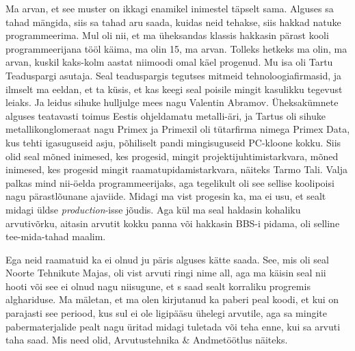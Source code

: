 Ma arvan, et see muster on ikkagi enamikel inimestel täpselt sama. Alguses sa tahad mängida, siis sa tahad aru saada, kuidas neid tehakse, siis hakkad natuke programmeerima. Mul oli nii, et ma üheksandas klassis hakkasin pärast kooli programmeerijana tööl käima,  ma olin 15, ma arvan. Tolleks hetkeks ma olin, ma arvan, kuskil kaks-kolm aastat niimoodi omal käel progenud. Mu isa oli Tartu Teaduspargi asutaja. Seal teaduspargis tegutses  mitmeid tehnoloogiafirmasid, ja ilmselt ma eeldan, et ta küsis, et kas keegi seal poisile mingit kasulikku tegevust leiaks. Ja leidus sihuke hulljulge mees nagu Valentin Abramov. Üheksakümnete alguses teatavasti toimus Eestis ohjeldamatu metalli-äri, ja Tartus oli sihuke metallikonglomeraat nagu Primex ja Primexil oli tütarfirma nimega Primex Data, kus tehti igasuguseid asju, põhiliselt pandi mingisuguseid PC-kloone kokku. Siis olid seal mõned inimesed, kes progesid, mingit projektijuhtimistarkvara, mõned inimesed, kes progesid mingit raamatupidamistarkvara, näiteks Tarmo Tali. Valja palkas mind nii-öelda programmeerijaks, aga tegelikult oli see sellise koolipoisi nagu pärastlõunane ajaviide. Midagi ma vist progesin ka, ma ei usu, et sealt midagi üldse \emph{production}-isse jõudis. Aga kül ma seal haldasin kohaliku arvutivõrku, aitasin arvutit kokku panna või hakkasin BBS-i pidama, oli selline tee-mida-tahad  maalim.


Ega neid raamatuid ka ei olnud ju päris alguses kätte saada. See, mis oli seal Noorte Tehnikute Majas, oli vist arvuti ringi nime all, aga ma käisin seal nii hooti või see ei olnud nagu niisugune, et s saad sealt  korraliku progremis alghariduse. Ma mäletan, et ma olen kirjutanud ka paberi peal koodi, et kui on parajasti see periood, kus sul ei ole ligipääsu ühelegi arvutile, aga sa mingite pabermaterjalide pealt nagu üritad midagi tuletada või teha enne, kui sa arvuti taha saad. Mis need olid, Arvutustehnika \& Andmetöötlus näiteks. 


